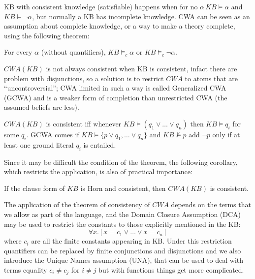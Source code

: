 KB with consistent knowledge (satisfiable) happens when for no $\alpha \, KB \models \alpha$
and $KB \models \neg \alpha$, but normally a KB has incomplete knowledge.\newline
CWA can be seen as an assumption about complete knowledge, or a way to 
make a theory complete, using the following theorem:
\begin{thm}
    For every $\alpha$ (without quantifiers), $KB \models_c \alpha$ or 
$KB \models_c \neg \alpha$.
\end{thm}
$CWA(KB)$ is not always consistent when KB is consistent, infact there are problem
with disjunctions, so a solution is to restrict $CWA$ to atoms that are 
“uncontroversial”; CWA limited in such a way is called Generalized CWA (GCWA) and
is a weaker form of completion than unrestricted CWA (the assumed beliefs are less).
\begin{thm}
   $CWA(KB)$ is consistent iff whenever $KB \models (q_1 \vee \dots \vee q_n)$
   then $KB \models q_i$ for some $q_i$.\newline
   GCWA comes if $KB \models \{ p \vee q_1, \dots \vee q_n\}$ and $KB \not \models p$
   add $\neg p$ only if at least one ground literal $q_i$ is entailed.
\end{thm}
Since it may be difficult the condition of the theorem, the following corollary, which
restricts the application, is also of practical importance:
\begin{corol}
    If the clause form of $KB$ is Horn and consistent, then $CWA(KB)$ is consistent.
\end{corol}
The application of the theorem of consistency of $CWA$ depends on the terms 
that we allow as part of the language, and the Domain Closure Assumption (DCA) 
may be used to restrict the constants to those explicitly mentioned in the KB:
\[ \forall x. [x = c_1 \lor \dots \lor x = c_n] \]
where $c_i$ are all the finite constants appearing in KB.\newline
Under this restriction quantifiers can be replaced by finite conjunctions
and disjunctions and we also introduce the Unique Names assumption (UNA),
that can be used to deal with terms equality $c_i \neq c_j$ for $i \neq j$
but with functions things get more complicated.

